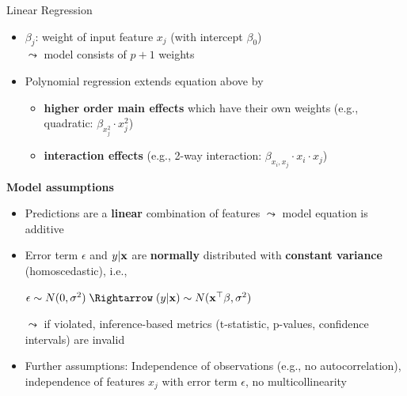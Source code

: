 \documentclass[11pt,compress,t,notes=noshow, aspectratio=169, xcolor=table]{beamer}
\begin{document}
\begin{frame}[c]{Linear Regression}
    \begin{itemize}
        \item $\beta_j$: weight of input feature $x_j$ (with intercept $\beta_0$)\\
        $\leadsto$ model consists of $p+1$ weights
        \item Polynomial regression extends equation above by
        \begin{itemize}
        \item \textbf{higher order main effects} which have their own weights (e.g., quadratic: $\beta_{x_j^2} \cdot x_j^2$)
        \item \textbf{interaction effects} (e.g., 2-way interaction: $\beta_{x_i, x_j} \cdot x_i \cdot x_j$)
        \end{itemize}
    \end{itemize}
   \vspace*{0.2cm} 
   \pause
    \textbf{Model assumptions} 
    \begin{itemize}
    \item Predictions are a \textbf{linear} combination of features $\leadsto$ model equation is additive%
    \item Error term $\epsilon$ and $y \vert \xv$ are \textbf{normally} distributed with \textbf{constant variance} (homoscedastic), i.e.,\\
    \centerline{$\epsilon \sim N(0, \sigma^2) \; \Rightarrow \; (y \vert \xv) \sim N(\xv^\top \beta, \sigma^2)$}
    $\leadsto$ if violated, inference-based metrics (t-statistic, p-values, confidence intervals) are invalid
    \item Further assumptions: Independence of observations (e.g., no autocorrelation), independence of features $x_j$ with error term $\epsilon$, no multicollinearity 

\end{itemize}
\end{frame}
\end{document}
